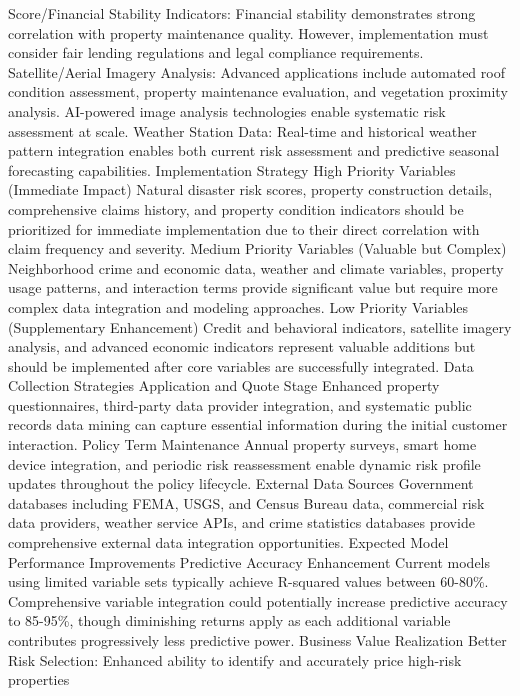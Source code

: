 \documentclass[8pt, twocolumn]{extarticle}
\begin{document}
Score/Financial Stability Indicators: Financial stability demonstrates
strong correlation with property maintenance quality. However,
implementation must consider fair lending regulations and legal
compliance requirements. Satellite/Aerial Imagery Analysis: Advanced
applications include automated roof condition assessment, property
maintenance evaluation, and vegetation proximity analysis. AI-powered
image analysis technologies enable systematic risk assessment at scale.
Weather Station Data: Real-time and historical weather pattern
integration enables both current risk assessment and predictive seasonal
forecasting capabilities. Implementation Strategy High Priority
Variables (Immediate Impact) Natural disaster risk scores, property
construction details, comprehensive claims history, and property
condition indicators should be prioritized for immediate implementation
due to their direct correlation with claim frequency and severity.
Medium Priority Variables (Valuable but Complex) Neighborhood crime and
economic data, weather and climate variables, property usage patterns,
and interaction terms provide significant value but require more complex
data integration and modeling approaches. Low Priority Variables
(Supplementary Enhancement) Credit and behavioral indicators, satellite
imagery analysis, and advanced economic indicators represent valuable
additions but should be implemented after core variables are
successfully integrated. Data Collection Strategies Application and
Quote Stage Enhanced property questionnaires, third-party data provider
integration, and systematic public records data mining can capture
essential information during the initial customer interaction. Policy
Term Maintenance Annual property surveys, smart home device integration,
and periodic risk reassessment enable dynamic risk profile updates
throughout the policy lifecycle. External Data Sources Government
databases including FEMA, USGS, and Census Bureau data, commercial risk
data providers, weather service APIs, and crime statistics databases
provide comprehensive external data integration opportunities. Expected
Model Performance Improvements Predictive Accuracy Enhancement Current
models using limited variable sets typically achieve R-squared values
between 60-80\%. Comprehensive variable integration could potentially
increase predictive accuracy to 85-95\%, though diminishing returns
apply as each additional variable contributes progressively less
predictive power. Business Value Realization Better Risk Selection:
Enhanced ability to identify and accurately price high-risk properties
\end{document}

